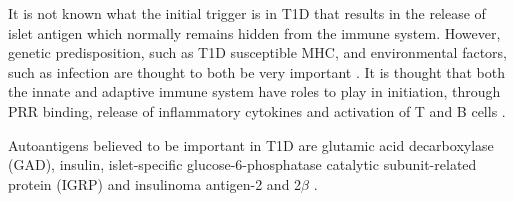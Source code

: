 It is not known what the initial trigger is in T1D that results in the release of islet antigen which normally remains hidden from the immune system.
However, genetic predisposition, such as T1D susceptible MHC, and environmental factors, such as infection \citep{Filippi2008} are thought to both be very important \citep{Knip2005}.
It is thought that both the innate and adaptive immune system have roles to play in initiation, through PRR binding, release of inflammatory cytokines and activation of T and B cells \citep{Diana2011}.

Autoantigens believed to be important in T1D are glutamic acid decarboxylase (GAD), insulin, islet-specific glucose-6-phosphatase catalytic subunit-related protein (IGRP) and insulinoma antigen-2 and 2$\beta$ \citep{Green1999, Roep2012}.








